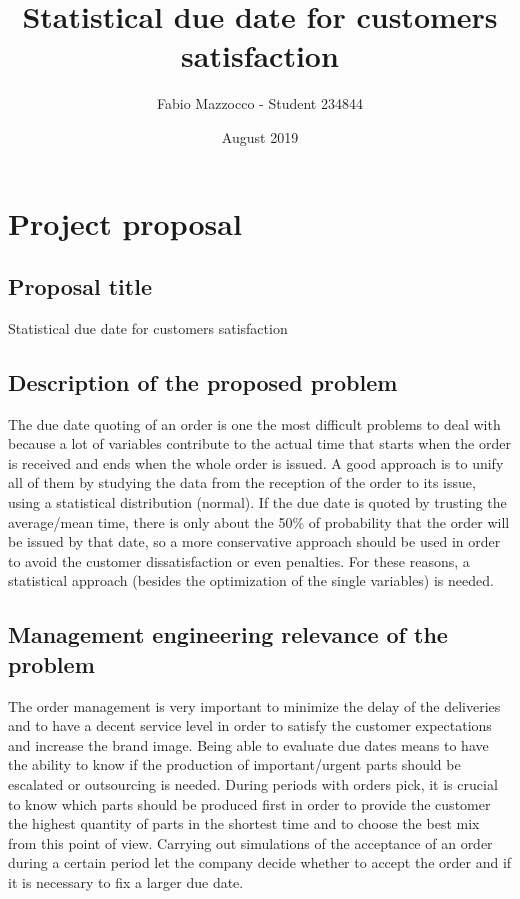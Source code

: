\documentclass[a4paper,12pt]{article}
\begin{document}


\title{Statistical due date for customers satisfaction }
\author{Fabio Mazzocco - Student  234844}
\date{August 2019}
\maketitle

\section{Project proposal} 
\subsection{Proposal title}
Statistical due date for customers satisfaction

\subsection{Description of the proposed problem}

The due date quoting of an order is one the most difficult problems to deal with because a lot of variables contribute to the actual time that starts when the order is received and ends when the whole order is issued. A good approach is to unify all of them by studying the data from the reception of the order to its issue, using a statistical distribution (normal). If the due date is quoted by trusting the average/mean time, there is only about the 50\% of probability that the order will be issued by that date, so a more conservative approach should be used in order to avoid the customer dissatisfaction or even penalties. For these reasons, a statistical approach (besides the optimization of the single variables) is needed.

\subsection{Management engineering relevance of the problem}

The order management is very important to minimize the delay of the deliveries and to have a decent service level in order to satisfy the customer expectations and increase the brand image. Being able to evaluate due dates means to have the ability to know if the production of important/urgent parts should be escalated or outsourcing is needed. During periods with orders pick, it is crucial to know which parts should be produced first in order to provide the customer the highest quantity of parts in the shortest time and to choose the best mix from this point of view. Carrying out simulations of the acceptance of an order during a certain period let the company decide whether to accept the order and if it is necessary to fix a larger due date.
\end{document}
